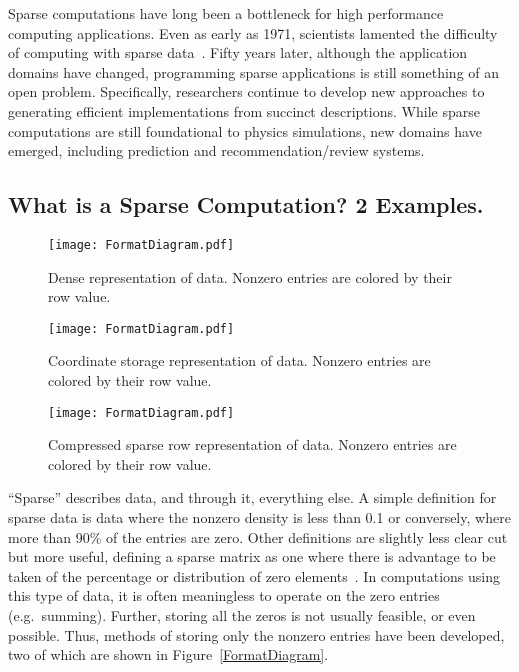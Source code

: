 Sparse computations have long been a bottleneck for high performance computing applications. 
Even as early as 1971, scientists lamented the difficulty of computing with sparse data~\cite{willoughby1971sparse}.
Fifty years later, although the application domains have changed, programming sparse applications is still something of an open problem.
Specifically, researchers continue to develop new approaches to generating efficient implementations from succinct descriptions.
While sparse computations are still foundational to physics simulations, new domains have emerged, including prediction and recommendation/review systems.

\subsection{What is a Sparse Computation? 2 Examples.}

\begin{figure*}
  \centering
  \begin{subfigure}{0.45\textwidth}
    \texttt{[image: FormatDiagram.pdf]}
    \caption{Dense representation of data. Nonzero entries are colored by their row value.}\label{FormatDiagram:Dense}
  \end{subfigure}
  \begin{subfigure}{0.45\textwidth}
    \texttt{[image: FormatDiagram.pdf]}
    \caption{Coordinate storage representation of data. Nonzero entries are colored by their row value.}\label{FormatDiagram:COO}
  \end{subfigure}

  \begin{subfigure}[c]{0.45\textwidth}
    \texttt{[image: FormatDiagram.pdf]}
    \caption{Compressed sparse row representation of data. Nonzero entries are colored by their row value.}\label{FormatDiagram:CSR}
  \end{subfigure}
\caption{Dense, COO, and CSR storage representations of the same data.}\label{FormatDiagram}
\end{figure*}
``Sparse'' describes data, and through it, everything else.
A simple definition for sparse data is data where the nonzero density is less than 0.1 or conversely, where more than 90\% of the entries are zero.
Other definitions are slightly less clear cut but more useful, defining a sparse matrix as one where there is advantage to be taken of the percentage or distribution of zero elements~\cite{duff1977survey}.
In computations using this type of data, it is often meaningless to operate on the zero entries (e.g.\ summing).
Further, storing all the zeros is not usually feasible, or even possible.
Thus, methods of storing only the nonzero entries have been developed, two of which are shown in Figure~\ref{FormatDiagram}.

